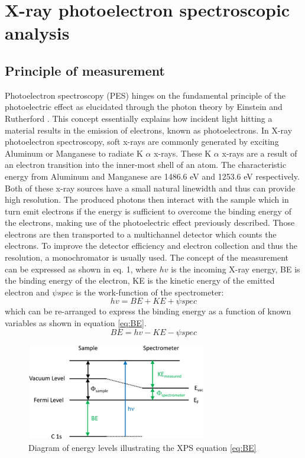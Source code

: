 \label{XPS_theory}
\section{X-ray photoelectron spectroscopic analysis}
\subsection{Principle of measurement}
Photoelectron spectroscopy (PES) hinges on the fundamental principle of the photoelectric effect  as elucidated through the photon theory by Einstein and Rutherford \cite{rutherford_xxxvii_1914, einstein_uber_1905}. This concept essentially explains how incident light hitting a material results in the emission of electrons, known as photoelectrons.
In X-ray photoelectron spectroscopy, soft x-rays are commonly generated by exciting Aluminum or Manganese to radiate K \(\alpha\) x-rays. These K $\alpha$ x-rays are a result of an electron transition into the inner-most shell of an atom. The characteristic energy from Aluminum and Manganese are 1486.6 eV and 1253.6 eV respectively. Both of these x-ray sources have a small natural linewidth and thus can provide high resolution. The produced photons then interact with the sample which in turn emit electrons if the energy is sufficient to overcome the binding energy of the electrons, making use of the photoelectric effect previously described. Those electrons are then transported to a multichannel detector which counts the electrons. To improve the detector efficiency and electron collection and thus the resolution, a monochromator is usually used.\cite{stevie_introduction_2020} The concept of the measurement can be expressed as shown in eq. 1, where $hv$ is the incoming X-ray energy, BE is the binding energy of the electron, KE is the kinetic energy of the emitted electron and $\psi spec$ is the work-function of the spectrometer:
\begin{equation}
    hv = BE + KE + \psi spec
    \label{eq:hv}
\end{equation}
which can be re-arranged to express the binding energy as a function of known variables \cite{stevie_introduction_2020} as shown in equation \ref{eq:BE}.
\begin{equation}
    BE = hv- KE - \psi spec
    \label{eq:BE}
\end{equation}

\begin{figure}
    \centering
    \includegraphics[width=0.7\textwidth]{Figures/image4_3.jpeg}
    \caption{Diagram of energy levels illustrating the XPS  equation \ref{eq:BE}}
    \label{fig:enter-label}
\end{figure}


